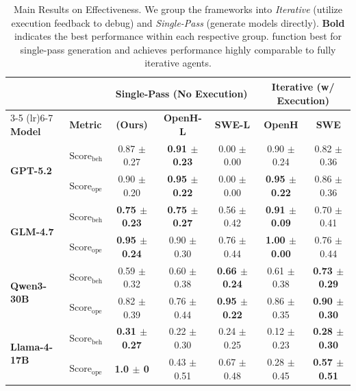 \begin{table}[t]
\centering
\caption{Main Results on Effectiveness. We group the frameworks into \emph{Iterative} (utilize execution feedback to debug) and \emph{Single-Pass} (generate models directly). \textbf{Bold} indicates the best performance within each respective group. \methodname{} function best for single-pass generation and achieves performance highly comparable to fully iterative agents.}
\begin{tabular}{llc@{\hskip 12pt}cc@{\hskip 12pt}cc} 
\toprule
& & \multicolumn{3}{c}{\textbf{Single-Pass (No Execution)}} & \multicolumn{2}{c}{\textbf{Iterative (w/ Execution)}} \\
\cmidrule(lr){3-5} \cmidrule(lr){6-7}
\textbf{Model} & \textbf{Metric} & \textbf{\methodname{} (Ours)} & \textbf{OpenH-L} & \textbf{SWE-L} & \textbf{OpenH} & \textbf{SWE} \\ 
\midrule
\multirow{2}{*}{\textbf{GPT-5.2}} 
& $\text{Score}_{\text{beh}}$ & 0.87 $\pm$ 0.27 & \textbf{0.91 $\pm$ 0.23} & 0.00 $\pm$ 0.00 & 0.90 $\pm$ 0.24 & 0.82 $\pm$ 0.36 \\
& $\text{Score}_{\text{ope}}$ & 0.90 $\pm$ 0.20 & \textbf{0.95 $\pm$ 0.22} & 0.00 $\pm$ 0.00 & \textbf{0.95 $\pm$ 0.22} & 0.86 $\pm$ 0.36 \\
\midrule
\multirow{2}{*}{\textbf{GLM-4.7}} 
& $\text{Score}_{\text{beh}}$ & \textbf{0.75 $\pm$ 0.23} & \textbf{0.75 $\pm$ 0.27} & 0.56 $\pm$ 0.42 & \textbf{0.91 $\pm$ 0.09} & 0.70 $\pm$ 0.41 \\
& $\text{Score}_{\text{ope}}$ & \textbf{0.95 $\pm$ 0.24} & 0.90 $\pm$ 0.30 & 0.76 $\pm$ 0.44 & \textbf{1.00 $\pm$ 0.00} & 0.76 $\pm$ 0.44 \\
\midrule
\multirow{2}{*}{\textbf{Qwen3-30B}} 
& $\text{Score}_{\text{beh}}$ & 0.59 $\pm$ 0.32 & 0.60 $\pm$ 0.38 & \textbf{0.66 $\pm$ 0.24} & 0.61 $\pm$ 0.38 & \textbf{0.73 $\pm$ 0.29} \\
& $\text{Score}_{\text{ope}}$ & 0.82 $\pm$ 0.39 & 0.76 $\pm$ 0.44 & \textbf{0.95 $\pm$ 0.22} & 0.86 $\pm$ 0.35 & \textbf{0.90 $\pm$ 0.30} \\
\midrule
\multirow{2}{*}{\textbf{Llama-4-17B}} 
& $\text{Score}_{\text{beh}}$ & \textbf{0.31 $\pm$ 0.27} & 0.22 $\pm$ 0.30 & 0.24 $\pm$ 0.25 & 0.12 $\pm$ 0.23 & \textbf{0.28 $\pm$ 0.30} \\
& $\text{Score}_{\text{ope}}$ & \textbf{1.0 $\pm$ 0} & 0.43 $\pm$ 0.51 & 0.67 $\pm$ 0.48 & 0.28 $\pm$ 0.45 & \textbf{0.57 $\pm$ 0.51} \\
\bottomrule
\end{tabular}\label{tab:main_results}
\end{table}

